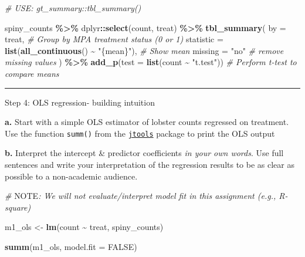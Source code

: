 \documentclass[
]{article}
\newenvironment{Shaded}{\begin{snugshade}}{\end{snugshade}}
\newcommand{\AlertTok}[1]{\textcolor[rgb]{0.94,0.16,0.16}{#1}}
\newcommand{\AttributeTok}[1]{\textcolor[rgb]{0.13,0.29,0.53}{#1}}
\newcommand{\CommentTok}[1]{\textcolor[rgb]{0.56,0.35,0.01}{\textit{#1}}}
\newcommand{\ConstantTok}[1]{\textcolor[rgb]{0.56,0.35,0.01}{#1}}
\newcommand{\FunctionTok}[1]{\textcolor[rgb]{0.13,0.29,0.53}{\textbf{#1}}}
\newcommand{\NormalTok}[1]{#1}
\newcommand{\OtherTok}[1]{\textcolor[rgb]{0.56,0.35,0.01}{#1}}
\newcommand{\SpecialCharTok}[1]{\textcolor[rgb]{0.81,0.36,0.00}{\textbf{#1}}}
\newcommand{\StringTok}[1]{\textcolor[rgb]{0.31,0.60,0.02}{#1}}
\begin{document}
\begin{Shaded}
\begin{Highlighting}[]
\CommentTok{\# USE: gt\_summary::tbl\_summary()}

\NormalTok{spiny\_counts }\SpecialCharTok{\%\textgreater{}\%}
\NormalTok{  dplyr}\SpecialCharTok{::}\FunctionTok{select}\NormalTok{(count, treat) }\SpecialCharTok{\%\textgreater{}\%}
  \FunctionTok{tbl\_summary}\NormalTok{(}
    \AttributeTok{by =}\NormalTok{ treat,  }\CommentTok{\# Group by MPA treatment status (0 or 1)}
    \AttributeTok{statistic =} \FunctionTok{list}\NormalTok{(}\FunctionTok{all\_continuous}\NormalTok{() }\SpecialCharTok{\textasciitilde{}} \StringTok{"\{mean\}"}\NormalTok{),  }\CommentTok{\# Show mean }
    \AttributeTok{missing =} \StringTok{"no"}  \CommentTok{\# remove missing values}
\NormalTok{  ) }\SpecialCharTok{\%\textgreater{}\%}
  \FunctionTok{add\_p}\NormalTok{(}\AttributeTok{test =} \FunctionTok{list}\NormalTok{(count }\SpecialCharTok{\textasciitilde{}} \StringTok{"t.test"}\NormalTok{))  }\CommentTok{\# Perform t{-}test to compare means}
\end{Highlighting}
\end{Shaded}

\begin{center}\rule{0.5\linewidth}{0.5pt}\end{center}

Step 4: OLS regression- building intuition

\textbf{a.} Start with a simple OLS estimator of lobster counts
regressed on treatment. Use the function \texttt{summ()} from the
\href{https://jtools.jacob-long.com/}{\texttt{jtools}} package to print
the OLS output

\textbf{b.} Interpret the intercept \& predictor coefficients \emph{in
your own words}. Use full sentences and write your interpretation of the
regression results to be as clear as possible to a non-academic
audience.

\begin{Shaded}
\begin{Highlighting}[]
\CommentTok{\# }\AlertTok{NOTE}\CommentTok{: We will not evaluate/interpret model fit in this assignment (e.g., R{-}square)}

\NormalTok{m1\_ols }\OtherTok{\textless{}{-}} \FunctionTok{lm}\NormalTok{(count }\SpecialCharTok{\textasciitilde{}}\NormalTok{ treat, spiny\_counts)}

\FunctionTok{summ}\NormalTok{(m1\_ols, }\AttributeTok{model.fit =} \ConstantTok{FALSE}\NormalTok{) }
\end{Highlighting}
\end{Shaded}
\end{document}
